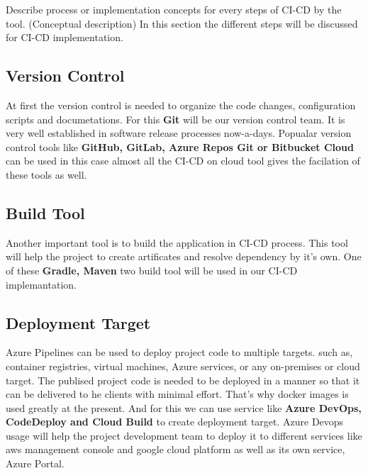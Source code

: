 Describe process or implementation concepts for every steps of CI-CD by the tool. (Conceptual description)
In this section the different steps will be discussed for CI-CD implementation.
\subsection{Version Control}
At first the version control is needed to organize the code changes, configuration scripts and documetations. For this \textbf{Git} will be our version control team. It is very well established in software release processes now-a-days. Popualar version control tools like \textbf{GitHub, GitLab, Azure Repos Git or Bitbucket Cloud} can be used in this case almost all the CI-CD on cloud tool gives the facilation of these tools as well.
\subsection{Build Tool}
Another important tool is to build the application in CI-CD process. This tool will help the project to create artificates and resolve dependency by it's own. One of these \textbf{Gradle, Maven} two build tool will be used in our CI-CD implemantation.
\subsection{Deployment Target}
Azure Pipelines can be used to deploy project code to multiple targets. such as, container registries, virtual machines, Azure services, or any on-premises or cloud target.
The publised project code is needed to be deployed in a manner so that it can be delivered to he clients with minimal effort. That's why docker images is used greatly at the present. And for this we can use service like \textbf{Azure DevOps, CodeDeploy and Cloud Build} to create deployment target. Azure Devops usage will help the project development team to deploy it to different services like aws management console and google cloud platform as well as its own service, Azure Portal.

